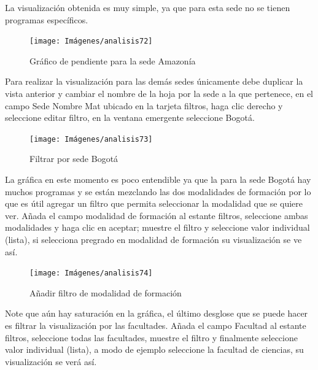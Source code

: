 \documentclass[
]{book}
\begin{document}
La visualización obtenida es muy simple, ya que para esta sede no se tienen programas específicos.

\begin{figure}

{\centering \texttt{[image: Imágenes/analisis72]} 

}

\caption{Gráfico de pendiente para la sede Amazonía}\label{fig:graficopendienteamazonia-fig}
\end{figure}

Para realizar la visualización para las demás sedes únicamente debe duplicar la vista anterior y cambiar el nombre de la hoja por la sede a la que pertenece, en el campo Sede Nombre Mat ubicado en la tarjeta filtros, haga clic derecho y seleccione editar filtro, en la ventana emergente seleccione Bogotá.

\begin{figure}

{\centering \texttt{[image: Imágenes/analisis73]} 

}

\caption{Filtrar por sede Bogotá}\label{fig:paso1graficopendientebogota-fig}
\end{figure}

La gráfica en este momento es poco entendible ya que la para la sede Bogotá hay muchos programas y se están mezclando las dos modalidades de formación por lo que es útil agregar un filtro que permita seleccionar la modalidad que se quiere ver. Añada el campo modalidad de formación al estante filtros, seleccione ambas modalidades y haga clic en aceptar; muestre el filtro y seleccione valor individual (lista), si selecciona pregrado en modalidad de formación su visualización se ve así.

\begin{figure}

{\centering \texttt{[image: Imágenes/analisis74]} 

}

\caption{Añadir filtro de modalidad de formación}\label{fig:paso2graficopendientebogota-fig}
\end{figure}

Note que aún hay saturación en la gráfica, el último desglose que se puede hacer es filtrar la visualización por las facultades. Añada el campo Facultad al estante filtros, seleccione todas las facultades, muestre el filtro y finalmente seleccione valor individual (lista), a modo de ejemplo seleccione la facultad de ciencias, su visualización se verá así.
\end{document}
